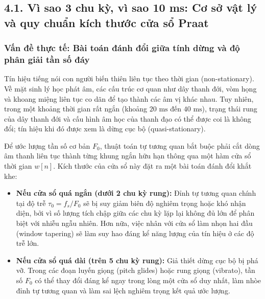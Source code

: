 \subsection*{4.1. Vì sao 3 chu kỳ, vì sao 10 ms: Cơ sở vật lý và quy chuẩn kích thước cửa sổ Praat}

\subsubsection*{Vấn đề thực tế: Bài toán đánh đổi giữa tính dừng và độ phân giải tần số đáy}
Tín hiệu tiếng nói con người biến thiên liên tục theo thời gian (non-stationary). Về mặt sinh lý học phát âm, các cấu trúc cơ quan như dây thanh đới, vòm họng và khoang miệng liên tục co dãn để tạo thành các âm vị khác nhau. Tuy nhiên, trong một khoảng thời gian rất ngắn (khoảng $20\text{ ms}$ đến $40\text{ ms}$), trạng thái rung của dây thanh đới và cấu hình âm học của thanh đạo có thể được coi là không đổi; tín hiệu khi đó được xem là dừng cục bộ (quasi-stationary).

Để ước lượng tần số cơ bản $F_0$, thuật toán tự tương quan bắt buộc phải cắt dòng âm thanh liên tục thành từng khung ngắn hữu hạn thông qua một hàm cửa sổ thời gian $w[n]$. Kích thước của cửa sổ này đặt ra một bài toán đánh đổi khắt khe:
\begin{itemize}[leftmargin=1.5em, itemsep=2pt]
    \item \textbf{Nếu cửa sổ quá ngắn (dưới 2 chu kỳ rung):} Đỉnh tự tương quan chính tại độ trễ $\tau_0 = f_s / F_0$ sẽ bị suy giảm biên độ nghiêm trọng hoặc khó nhận diện, bởi vì số lượng tích chập giữa các chu kỳ lặp lại không đủ lớn để phân biệt với nhiễu ngẫu nhiên. Hơn nữa, việc nhân với cửa sổ làm nhọn hai đầu (window tapering) sẽ làm suy hao đáng kể năng lượng của tín hiệu ở các độ trễ lớn.
    \item \textbf{Nếu cửa sổ quá dài (trên 5 chu kỳ rung):} Giả thiết dừng cục bộ bị phá vỡ. Trong các đoạn luyến giọng (pitch glides) hoặc rung giọng (vibrato), tần số $F_0$ có thể thay đổi đáng kể ngay trong lòng một cửa sổ duy nhất, làm nhòe đỉnh tự tương quan và làm sai lệch nghiêm trọng kết quả ước lượng.
\end{itemize}

